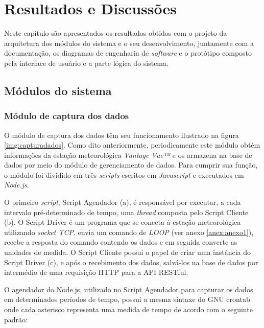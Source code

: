 \chapter{Resultados e Discussões} \label{ch:RD}


Neste capítulo são apresentados os resultados obtidos com o projeto da arquitetura dos módulos do sistema e o seu desenvolvimento, juntamente com a documentação, os diagramas de engenharia de \textit{software} e o protótipo composto pela interface de usuário e a parte lógica do sistema.


\section{Módulos do sistema} \label{subsec:modules}

\subsection{Módulo de captura dos dados} 

O módulo de captura dos dados têm seu funcionamento ilustrado na figura \ref{img:capturadados}. Como dito anteriormente, periodicamente este módulo obtém informações da estação meteorológica \textit{Vantage Vue™} e os armazena na base de dados por meio do módulo de gerenciamento de dados. Para cumprir sua função, o módulo foi dividido em três \textit{scripts} escritos em \textit{Javascript} e executados em \textit{Node.js}. 


O primeiro \textit{script}, Script Agendador (a), é responsável por executar, a cada intervalo pré-determinado de tempo, uma \textit{thread} composta pelo Script Cliente (b). O Script Driver é um programa que se conecta à estação meteorológica utilizando \textit{socket TCP}, envia um comando de \textit{LOOP} (ver anexo \ref{anex:anexo1}), recebe a resposta do comando contendo os dados e em seguida converte as unidades de medida. O Script Cliente possui o papel de criar uma instância do Script Driver (c), e após o recebimento dos dados, salvá-los na base de dados por intermédio de uma requisição HTTP para a API RESTful.

O agendador do Node.js, utilizado no Script Agendador para capturar os dados em determinados períodos de tempo, possui a mesma sintaxe do GNU crontab \cite{SITEGNUCRONTAB, SITEVIVALINUXCRONTAB, NODECRON} onde cada asterisco representa uma medida de tempo de acordo com o seguinte padrão:
 
